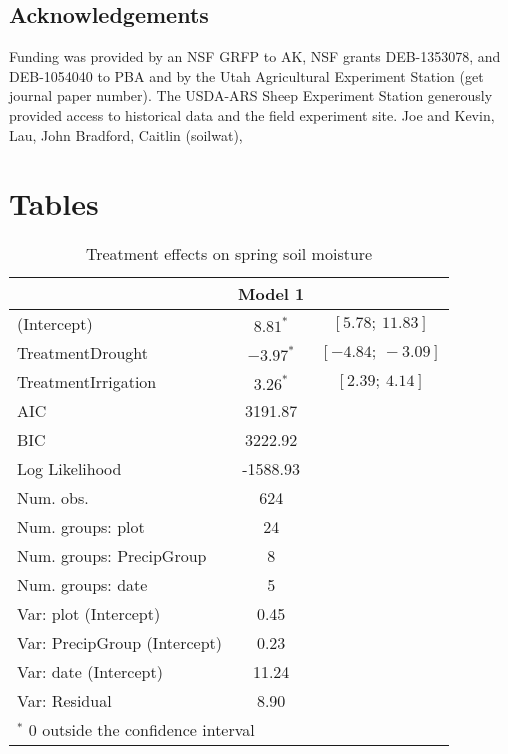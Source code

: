 \documentclass[11pt]{article}
\begin{document}
\begin{doublespacing}
\section*{Acknowledgements}

Funding was provided by an NSF GRFP to AK, NSF grants DEB-1353078, and DEB-1054040 to PBA and by the Utah Agricultural Experiment Station (get journal paper number). The USDA-ARS Sheep Experiment Station generously provided access to historical data and the field experiment site. Joe and Kevin, Lau, John Bradford, Caitlin (soilwat), 

\newpage




\end{doublespacing} 

\clearpage
\newpage

\section*{Tables}

\begin{table}[h]
	\caption{Treatment effects on spring soil moisture}
	\centering
	\begin{tabular}{l c c }
		\hline
		& Model 1 \\
		\hline
		(Intercept)                  & $8.81^{*}$    	& $[5.78;\ 11.83]$  \\
		TreatmentDrought             & $-3.97^{*}$      & $[-4.84;\ -3.09]$ \\
		TreatmentIrrigation          & $3.26^{*}$       & $[2.39;\ 4.14]$   \\
		\hline
		AIC                          & 3191.87           \\
		BIC                          & 3222.92           \\
		Log Likelihood               & -1588.93          \\
		Num. obs.                    & 624               \\
		Num. groups: plot            & 24                \\
		Num. groups: PrecipGroup     & 8                 \\
		Num. groups: date            & 5                 \\
		Var: plot (Intercept)        & 0.45              \\
		Var: PrecipGroup (Intercept) & 0.23              \\
		Var: date (Intercept)        & 11.24             \\
		Var: Residual                & 8.90              \\
		\hline
		\multicolumn{2}{l}{\scriptsize{$^*$ 0 outside the confidence interval}}
	\end{tabular}
	\label{table:spotVWC}
\end{table}
\end{document}
